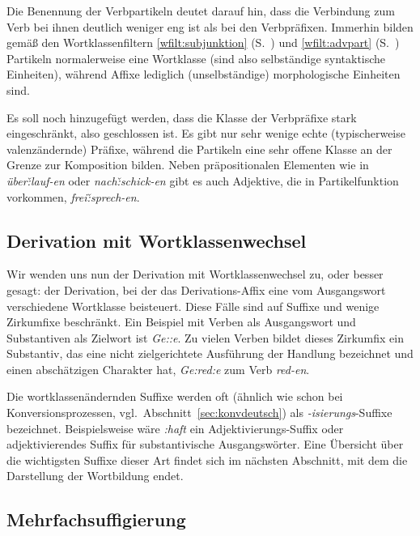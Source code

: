 Die Benennung der Verbpartikeln deutet darauf hin, dass die Verbindung zum Verb bei ihnen deutlich weniger eng ist als bei den Verbpräfixen.
Immerhin bilden gemäß den Wortklassenfiltern \ref{wfilt:subjunktion} (S.~\pageref{wfilt:subjunktion}) und \ref{wfilt:advpart} (S.~\pageref{wfilt:advpart}) Partikeln normalerweise eine Wortklasse (sind also selbständige syntaktische Einheiten), während Affixe lediglich (unselbständige) morphologische Einheiten sind.

Es soll noch hinzugefügt werden, dass die Klasse der Verbpräfixe stark eingeschränkt, also geschlossen ist.
Es gibt nur sehr wenige echte (typischerweise valenzändernde) Präfixe, während die Partikeln eine sehr offene Klasse an der Grenze zur Komposition bilden.
Neben präpositionalen Elementen wie in \textit{über\v:lauf-en} oder \textit{nach\v:schick-en} gibt es \zB auch Adjektive, die in Partikelfunktion vorkommen, \zB \textit{frei\v:sprech-en}. 

\subsection{Derivation mit Wortklassenwechsel}

Wir wenden uns nun der Derivation mit Wortklassenwechsel zu, oder besser gesagt: der Derivation, bei der das Derivations-Affix eine vom Ausgangswort verschiedene Wortklasse beisteuert.
Diese Fälle sind auf Suffixe und wenige Zirkumfixe beschränkt.
Ein Beispiel mit Verben als Ausgangswort und Substantiven als Zielwort ist \textit{Ge::e}.
Zu vielen Verben bildet dieses Zirkumfix ein Substantiv, das eine nicht zielgerichtete Ausführung der Handlung bezeichnet und einen abschätzigen Charakter hat, \zB \textit{Ge:red:e} zum Verb \textit{red-en}.

Die wortklassenändernden Suffixe werden oft (ähnlich wie schon bei Konversionsprozessen, vgl.\ Abschnitt~\ref{sec:konvdeutsch}) als \textit{-isierungs}-Suffixe bezeichnet.
Beispielsweise wäre \textit{:haft} ein Adjektivierungs-Suffix oder adjektivierendes Suffix für substantivische Ausgangswörter.
Eine Übersicht über die wichtigsten Suffixe dieser Art findet sich im nächsten Abschnitt, mit dem die Darstellung der Wortbildung endet.

\subsection{Mehrfachsuffigierung}

\label{sec:doppelsuff}

